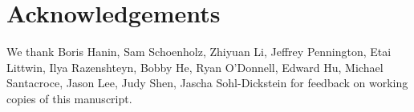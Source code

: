 \documentclass{article}
\theoremstyle{definition}
\theoremstyle{remark}
\begin{document}
\section*{Acknowledgements}

We thank Boris Hanin, Sam Schoenholz, Zhiyuan Li, Jeffrey Pennington, Etai Littwin, Ilya Razenshteyn, Bobby He, Ryan O'Donnell, Edward Hu, Michael Santacroce, Jason Lee, Judy Shen, Jascha Sohl-Dickstein for feedback on working copies of this manuscript.



\newpage

\appendix














\end{document}
